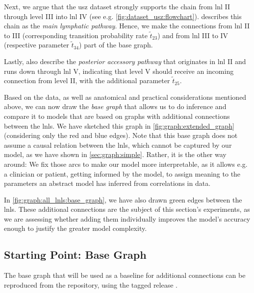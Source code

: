 \documentclass[\relativeRoot/main.tex]{subfiles}
\begin{document}
Next, we argue that the \gls{usz} dataset strongly supports the chain from \gls{lnl} II through level III into \gls{lnl} IV (see e.g. \cref{fig:dataset_usz:flowchart}).  describes this chain as the \emph{main lymphatic pathway}. Hence, we make the connections from \gls{lnl} II to III (corresponding transition probability rate $\tilde{t}_{23}$) and from \gls{lnl} III to IV (respective parameter $\tilde{t}_{34}$) part of the base graph.

Lastly,  also describe the \emph{posterior accessory pathway} that originates in \gls{lnl} II and runs down through \gls{lnl} V, indicating that level V should receive an incoming connection from level II, with the additional parameter $\tilde{t}_{25}$.

Based on the data, as well as anatomical and practical considerations mentioned above, we can now draw the \emph{base graph} that allows us to do inference and compare it to models that are based on graphs with additional connections between the \glspl{lnl}. We have sketched this graph in \cref{fig:graph:extended_graph} (considering only the red and blue edges). Note that this base graph does not assume a causal relation between the \glspl{lnl}, which cannot be captured by our model, as we have shown in \cref{sec:graph:simple}. Rather, it is the other way around: We fix those arcs to make our model more interpretable, as it allows e.g. a clinician or patient, getting informed by the model, to assign meaning to the parameters an abstract model has inferred from correlations in data.

In \cref{fig:graph:all_lnls:base_graph}, we have also drawn green edges between the \glspl{lnl}. These additional connections are the subject of this section's experiments, as we are assessing whether adding them individually improves the model's accuracy enough to justify the greater model complexity.

\subsection{Starting Point: Base Graph}
\label{subsec:graph:extended:base}

\begin{tcolorbox}[title=\faIcon{recycle} Reproducibility, parbox=false]
    The base graph that will be used as a baseline for additional connections can be reproduced from the  repository, using the tagged release .
\end{tcolorbox}
\end{document}
